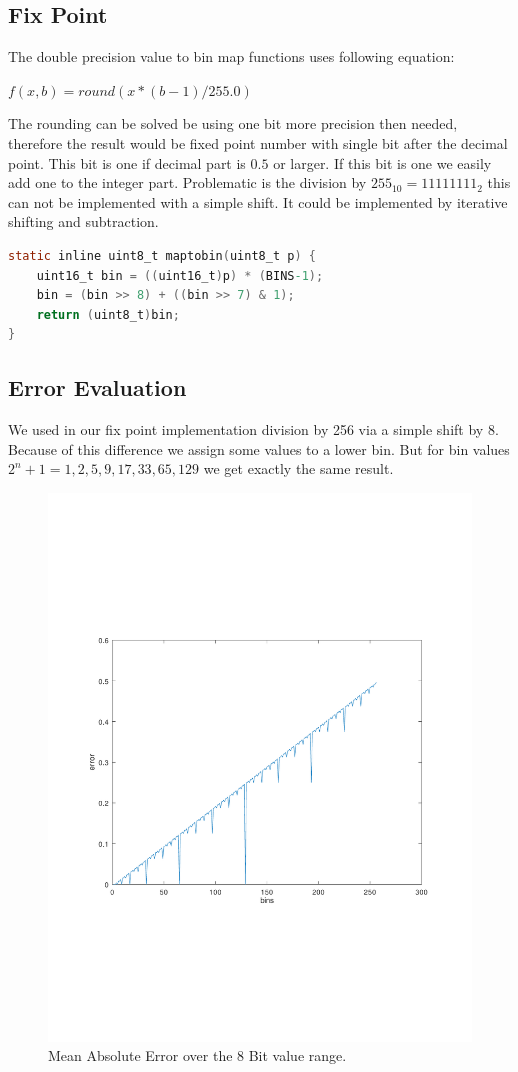 \documentclass[a4paper]{scrartcl}
\begin{document}
\subsection{Fix Point}

The double precision value to bin map functions uses following equation: 

$f(x,b) = round(x*(b-1)/255.0)$

The rounding can be solved be using one bit more precision then needed, therefore the result would be fixed point number with single bit after the decimal point. This bit is one if decimal part is $0.5$ or larger. If this bit is one we easily add one to the integer part. Problematic is the division by $255_{10}=11111111_2$ this can not be implemented with a simple shift. It could be implemented by iterative shifting and subtraction. 

\begin{minipage}{\linewidth}
\begin{lstlisting}[language=C]
static inline uint8_t maptobin(uint8_t p) {
	uint16_t bin = ((uint16_t)p) * (BINS-1);
	bin = (bin >> 8) + ((bin >> 7) & 1);
	return (uint8_t)bin;
}
\end{lstlisting}
\end{minipage}

\subsection{Error Evaluation}

We used in our fix point implementation division by 256 via a simple shift by 8. Because of this difference we assign some values to a lower bin. But for bin values $2^n+1 = {1,2,5,9,17,33,65,129}$ we get exactly the same result.

\begin{figure}[h]
	\centering
	\includegraphics[width=0.5\linewidth]{histoerror}
	\caption{Mean Absolute Error over the 8 Bit value range.}
\end{figure}
\end{document}
